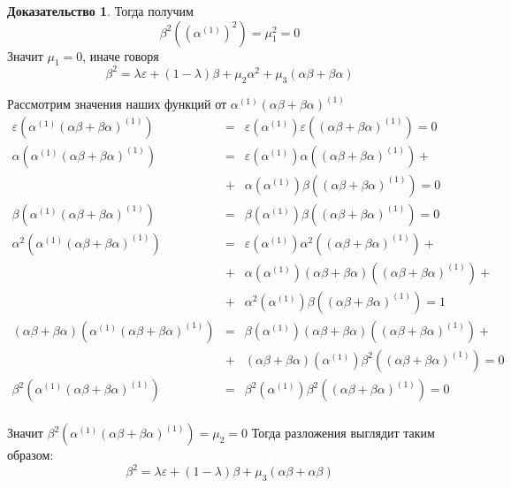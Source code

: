 \documentclass[a4paper, 12pt]{article}
\theoremstyle{definition}
\newtheorem*{prof}{\hspace*{\parindent}Доказательство}
\begin{document}
\begin{prof}
    Тогда получим \[
    \beta^2\left(\left(\alpha^{(1)}\right)^2\right) = \mu_1^2 = 0
    \]
    Значит $\mu_1 = 0$, иначе говоря \[
    \beta^2 = \lambda\varepsilon+(1-\lambda)\beta + \mu_2\alpha^2 + \mu_3(\alpha\beta+\beta\alpha)
    \]

    Рассмотрим значения наших функций от $\alpha^{(1)}(\alpha\beta+\beta\alpha)^{(1)}$
    \begin{eqnarray*}
    \varepsilon\left(\alpha^{(1)}(\alpha\beta+\beta\alpha)^{(1)}\right) &=& 
    \varepsilon\left(\alpha^{(1)}\right)\varepsilon\left((\alpha\beta+\beta\alpha)^{(1)}\right) = 0\\
    \alpha\left(\alpha^{(1)}(\alpha\beta+\beta\alpha)^{(1)}\right) &=&
    \varepsilon\left(\alpha^{(1)}\right)\alpha\left((\alpha\beta+\beta\alpha)^{(1)}\right)+\\
    &+&\alpha\left(\alpha^{(1)}\right)\beta\left((\alpha\beta+\beta\alpha)^{(1)}\right) = 0\\
    \beta\left(\alpha^{(1)}(\alpha\beta+\beta\alpha)^{(1)}\right) &=&
    \beta\left(\alpha^{(1)}\right)\beta\left((\alpha\beta+\beta\alpha)^{(1)}\right) = 0\\
    \alpha^2\left(\alpha^{(1)}(\alpha\beta+\beta\alpha)^{(1)}\right) &=&
    \varepsilon\left(\alpha^{(1)}\right)\alpha^2\left((\alpha\beta+\beta\alpha)^{(1)}\right)+\\
    &+&
    \alpha\left(\alpha^{(1)}\right)(\alpha\beta+\beta\alpha)\left((\alpha\beta+\beta\alpha)^{(1)}\right)+\\
    &+& \alpha^2\left(\alpha^{(1)}\right)\beta\left((\alpha\beta+\beta\alpha)^{(1)}\right) = 1\\
    (\alpha\beta+\beta\alpha)\left(\alpha^{(1)}(\alpha\beta+\beta\alpha)^{(1)}\right) &=&
    \beta\left(\alpha^{(1)}\right)(\alpha\beta+\beta\alpha)\left((\alpha\beta+\beta\alpha)^{(1)}\right)+\\
    &+&(\alpha\beta+\beta\alpha)\left(\alpha^{(1)}\right)\beta^2\left((\alpha\beta+\beta\alpha)^{(1)}\right) = 0\\
    \beta^2\left(\alpha^{(1)}(\alpha\beta+\beta\alpha)^{(1)}\right) &=& \beta^2\left(\alpha^{(1)}\right)\beta^2\left((\alpha\beta+\beta\alpha)^{(1)}\right) = 0\\
    \end{eqnarray*}

    Значит $\beta^2\left(\alpha^{(1)}(\alpha\beta+\beta\alpha)^{(1)}\right) = \mu_2 = 0$
    Тогда разложения выглядит таким образом:\[
    \beta^2 = \lambda\varepsilon+ (1-\lambda)\beta + \mu_3(\alpha\beta+\alpha\beta)
    \]


\end{prof}
\end{document}
